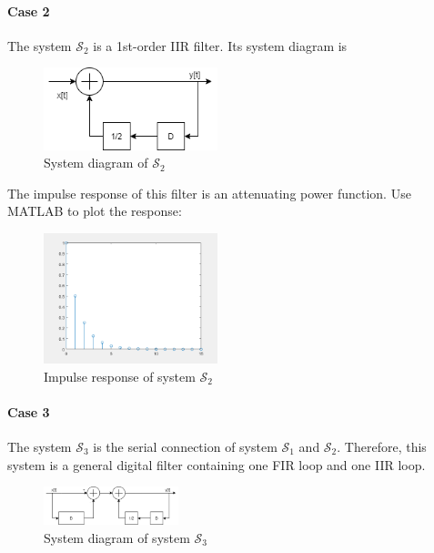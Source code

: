 \documentclass[conference]{IEEEtran}
\begin{document}
\paragraph{Case 2}
The system \(\mathcal{S}_{2}\) is a 1st-order IIR filter. Its system diagram is
\begin{figure}[htpb]
	\includegraphics[width=0.45\textwidth]{24-2.png}
	\caption{System diagram of \(\mathcal{S}_{2}\)}
	\label{fig:15}
\end{figure}

The impulse response of this filter is an attenuating power function. Use MATLAB to plot the response:
\begin{figure}[htpb]
	\includegraphics[width=0.45\textwidth]{../matlab/q24_2.png}
	\caption{Impulse response of system \(\mathcal{S}_{2}\)}
	\label{fig:16}
\end{figure}

\paragraph{Case 3}
The system \(\mathcal{S}_{3}\) is the serial connection of system \(\mathcal{S}_{1}\) and \(\mathcal{S}_{2}\). Therefore, this system is a general digital filter
containing one FIR loop and one IIR loop.
\begin{figure}[htpb]
	\begin{small}
		\begin{center}
			\includegraphics[width=0.35\textwidth]{24-3.png}
		\end{center}
		\caption{System diagram of system \(\mathcal{S}_{3}\)}
		\label{fig:17}
	\end{small}
\end{figure}
\end{document}
